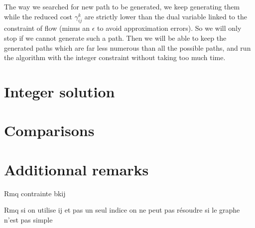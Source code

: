 The way we searched for new path to be generated, we keep generating them while the reduced cost $\gamma^k_{ij}$ are strictly lower than the dual variable linked to the constraint of flow (minus an $\epsilon$ to avoid approximation errors). So we will only stop if we cannot generate such a path. Then we will be able to keep the generated paths which are far less numerous than all the possible paths, and run the algorithm with the integer constraint without taking too much time.

\section{Integer solution}

\section{Comparisons}
\section{Additionnal remarks}









Rmq contrainte bkij

Rmq si on utilise ij et pas un seul indice on ne peut pas résoudre si le graphe n'est pas simple
